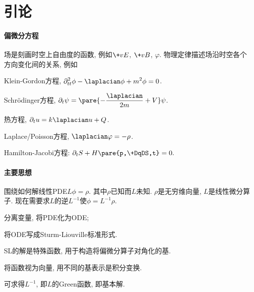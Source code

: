 \documentclass[hidelinks]{ctexart}
\begin{document}
\section{引论} %
\label{sec:引论}

\paragraph{偏微分方程} %
\label{par:偏微分方程}

场是刻画时空上自由度的函数, 例如$\+vE$, $\+vB$, $\varphi$. 物理定律描述场沿时空各个方向变化间的关系, 例如
\begin{cenum}
    \item Klein-Gordon方程, $\displaystyle \partial_{tt}^2\phi - \laplacian \phi + m^2\phi = 0$.
    \item Schr\"odinger方程, $\displaystyle \partial_t \psi = \pare{-\frac{\laplacian}{2m}+V}\psi$.
    \item 热方程, $\displaystyle \partial_t u = k \laplacian u + Q$.
    \item Laplace/Poisson方程, $\displaystyle \laplacian \varphi = -\rho$.
    \item Hamilton-Jacobi方程: $\displaystyle \partial_t S + H\pare{p,\+DqDS,t} = 0.$
\end{cenum}



\paragraph{主要思想} %
\label{par:主要思想}

围绕如何解线性PDE$L\phi = \rho$. 其中$\rho$已知而$L$未知. $\rho$是无穷维向量, $L$是线性微分算子. 现在需要求$L$的逆$L^{-1}$使$\phi = L^{-1}\rho$.
\begin{cenum}
    \item 分离变量, 将PDE化为ODE;
    \item 将ODE写成Sturm-Liouville标准形式.
    \item SL的解是特殊函数, 用于构造将偏微分算子对角化的基.
    \item 将函数视为向量, 用不同的基表示是积分变换.
    \item 可求得$L^{-1}$, 即$L$的Green函数, 即基本解.
\end{cenum}


\end{document}
